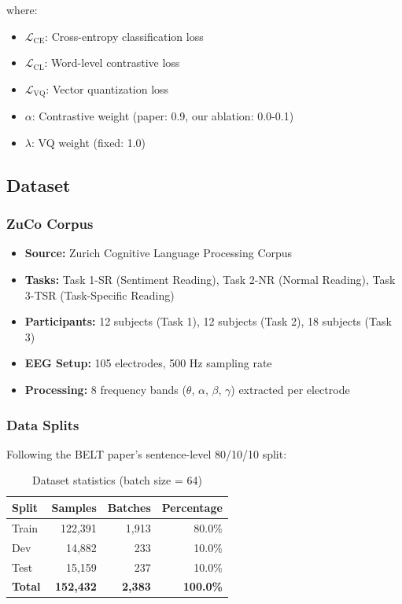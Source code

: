 \documentclass[12pt,a4paper]{article}
\begin{document}
\noindent where:
\begin{itemize}
    \item $\mathcal{L}_{\text{CE}}$: Cross-entropy classification loss
    \item $\mathcal{L}_{\text{CL}}$: Word-level contrastive loss
    \item $\mathcal{L}_{\text{VQ}}$: Vector quantization loss
    \item $\alpha$: Contrastive weight (paper: 0.9, our ablation: 0.0-0.1)
    \item $\lambda$: VQ weight (fixed: 1.0)
\end{itemize}

\subsection{Dataset}

\subsubsection{ZuCo Corpus}
\begin{itemize}
    \item \textbf{Source:} Zurich Cognitive Language Processing Corpus
    \item \textbf{Tasks:} Task 1-SR (Sentiment Reading), Task 2-NR (Normal Reading), Task 3-TSR (Task-Specific Reading)
    \item \textbf{Participants:} 12 subjects (Task 1), 12 subjects (Task 2), 18 subjects (Task 3)
    \item \textbf{EEG Setup:} 105 electrodes, 500 Hz sampling rate
    \item \textbf{Processing:} 8 frequency bands ($\theta$, $\alpha$, $\beta$, $\gamma$) extracted per electrode
\end{itemize}

\subsubsection{Data Splits}
Following the BELT paper's sentence-level 80/10/10 split:

\begin{table}[H]
\centering
\begin{tabular}{lrrr}
\toprule
\textbf{Split} & \textbf{Samples} & \textbf{Batches} & \textbf{Percentage} \\
\midrule
Train & 122,391 & 1,913 & 80.0\% \\
Dev & 14,882 & 233 & 10.0\% \\
Test & 15,159 & 237 & 10.0\% \\
\midrule
\textbf{Total} & \textbf{152,432} & \textbf{2,383} & \textbf{100.0\%} \\
\bottomrule
\end{tabular}
\caption{Dataset statistics (batch size = 64)}
\end{table}
\end{document}
